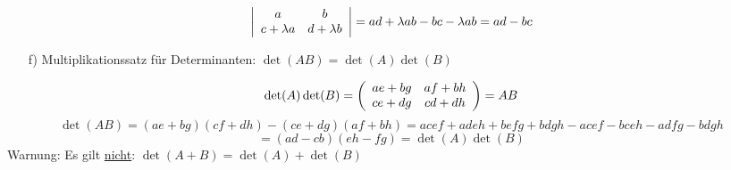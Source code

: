 \documentclass{article}
\begin{document}
\begin{equation*}
    \left\lvert \begin{array}{c c}a & b\\c+\lambda a & d+\lambda b\end{array} \right\rvert = ad+\lambda ab - bc -\lambda ab = ad - bc
\end{equation*}
\begin{itemize}
    \item[f)] Multiplikationssatz für Determinanten: $\det(AB) = \det(A)\det(B)$
\end{itemize}
\begin{equation*}
    \det(A)\det(B) = \left(\begin{array}{c c}ae + bg& af + bh\\ce + dg & cd + dh\end{array}\right) = AB
\end{equation*}
\begin{equation*}
    \det(AB)=(ae+bg)(cf+dh)-(ce+dg)(af+bh)=acef+adeh+befg+bdgh-acef-bceh-adfg-bdgh
\end{equation*}
\begin{equation*}
    = (ad-cb)(eh-fg) = \det(A)\det(B)
\end{equation*}
Warnung: Es gilt \underline{nicht}: $\det(A+B) = \det(A)+\det(B)$
\end{document}

